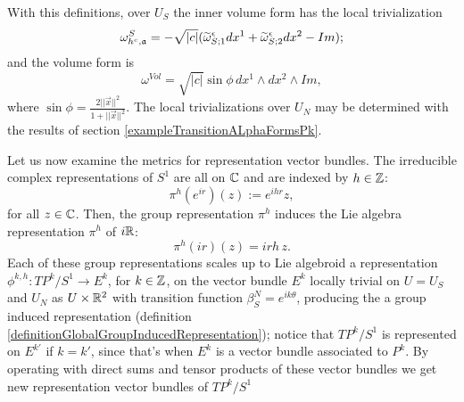 With this definitions, over $U_S$ the inner volume form has the local trivialization
\begin{equation}
    \omega^S_{h^c, \alg a} = -\sqrt{|c|} (\tilde \omega^\epsilon_{S; 1}dx^1 + \tilde \omega^\epsilon_{S; 2}dx^2 - Im);
\end{equation}
and the volume form is
\begin{equation}
    \omega^{Vol} = \sqrt{|c|} \sin \phi \, dx^1 \wedge dx^2 \wedge Im,
\end{equation}
where $\sin \phi = \frac{2 ||\vec x||^2}{1 + ||\vec x||^2}$.
The local trivializations over $U_N$ may be determined with the results of section \ref{exampleTransitionALphaFormsPk}.

Let us now examine the metrics for representation vector bundles. The irreducible complex representations of $S^1$ are all on $\mathbb{C}$ and are indexed by $h \in \mathbb{Z}$:
\begin{equation*}
    \pi^h(e^{ir})(z) := e^{ihr}z,
\end{equation*}
for all $z \in \mathbb{C}$. Then, the group representation $\pi^h$ induces the Lie algebra representation $\pi^h$ of $i\mathbb{R}$:
\begin{equation}\label{equationRepresentationS1Ch}
    \pi^h(ir)(z) = irh\,z.
\end{equation}
Each of these group representations scales up to Lie algebroid a representation $\phi^{k, h}: TP^k/S^1 \to E^k$, for $k \in \mathbb{Z}$, on the vector bundle $E^k$ locally trivial on $U = U_S$ and $U_N$ as $U\times \mathbb{R}^2$ with transition function $\beta^N_S = e^{ik\theta}$, producing the a group induced representation (definition \ref{definitionGlobalGroupInducedRepresentation}); notice that $TP^k/S^1$ is represented on $E^{k'}$ if $k = k'$, since that's when $E^k$ is a vector bundle associated to $P^k$. By operating with direct sums and tensor products of these vector bundles we get new representation vector bundles of $TP^k/S^1$

